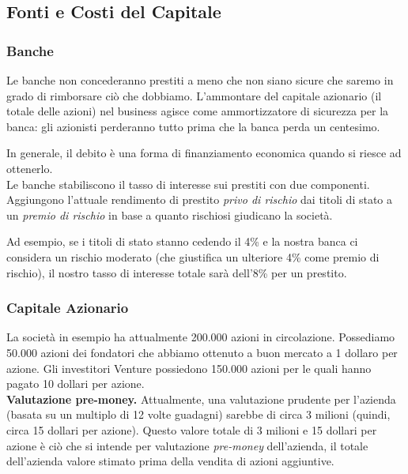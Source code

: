 \documentclass[a4paper,portrait,12pt]{article}
\theoremstyle{definition}
\begin{document}
\subsection{Fonti e Costi del Capitale}


\subsubsection{Banche}

Le banche non concederanno prestiti a meno che non siano sicure che saremo in grado di rimborsare ciò che dobbiamo.
L'ammontare del capitale azionario (il totale delle azioni) nel business agisce come ammortizzatore di sicurezza per la banca: gli azionisti perderanno tutto prima che la banca perda un centesimo.

In generale, il debito è una forma di finanziamento economica quando si riesce ad ottenerlo.\\

Le banche stabiliscono il tasso di interesse sui prestiti con due componenti.
Aggiungono l'attuale rendimento di prestito \emph{privo di rischio} dai titoli di stato a un \emph{premio di rischio} in base a quanto rischiosi giudicano la società.

Ad esempio, se i titoli di stato stanno cedendo il 4\% e la nostra banca ci considera un rischio moderato (che giustifica un ulteriore 4\% come premio di rischio), il nostro tasso di interesse totale sarà dell'8\% per un prestito.

\subsubsection{Capitale Azionario}

La società in esempio ha attualmente 200.000 azioni in circolazione.
Possediamo 50.000 azioni dei fondatori che abbiamo ottenuto a buon mercato a 1 dollaro per azione.
Gli investitori Venture possiedono 150.000 azioni per le quali hanno pagato 10 dollari per azione.\\

\textbf{Valutazione pre-money.}
Attualmente, una valutazione prudente per l'azienda (basata su un multiplo di 12 volte guadagni) sarebbe di circa 3 milioni (quindi, circa 15 dollari per azione).
Questo valore totale di 3 milioni e 15 dollari per azione è ciò che si intende per valutazione \emph{pre-money} dell'azienda, il totale dell'azienda valore stimato prima della vendita di azioni aggiuntive.\\
\end{document}
